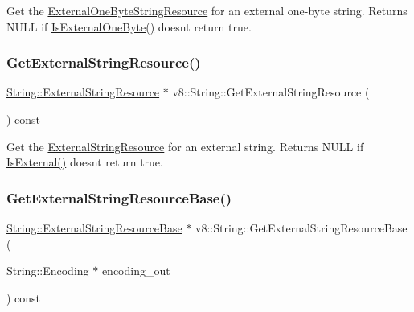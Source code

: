 Get the \mbox{\hyperlink{classv8_1_1String_1_1ExternalOneByteStringResource}{External\+One\+Byte\+String\+Resource}} for an external one-\/byte string. Returns N\+U\+LL if \mbox{\hyperlink{classv8_1_1String_a29b5d1786d906b84e10a5cab9451f976}{Is\+External\+One\+Byte()}} doesn\textquotesingle{}t return true. \mbox{\label{classv8_1_1String_ac751c8c239eb213a879204cab6787883}} 
\subsubsection{\texorpdfstring{Get\+External\+String\+Resource()}{GetExternalStringResource()}}
{\footnotesize\ttfamily \mbox{\hyperlink{classv8_1_1String_1_1ExternalStringResource}{String\+::\+External\+String\+Resource}} $\ast$ v8\+::\+String\+::\+Get\+External\+String\+Resource (\begin{DoxyParamCaption}{ }\end{DoxyParamCaption}) const}

Get the \mbox{\hyperlink{classv8_1_1String_1_1ExternalStringResource}{External\+String\+Resource}} for an external string. Returns N\+U\+LL if \mbox{\hyperlink{classv8_1_1String_a1d24faa97c6168221ec362c395d41ce1}{Is\+External()}} doesn\textquotesingle{}t return true. \mbox{\label{classv8_1_1String_a3031c6406f3f84bbc2d9810477a07489}} 
\subsubsection{\texorpdfstring{Get\+External\+String\+Resource\+Base()}{GetExternalStringResourceBase()}}
{\footnotesize\ttfamily \mbox{\hyperlink{classv8_1_1String_1_1ExternalStringResourceBase}{String\+::\+External\+String\+Resource\+Base}} $\ast$ v8\+::\+String\+::\+Get\+External\+String\+Resource\+Base (\begin{DoxyParamCaption}\item[{String\+::\+Encoding $\ast$}]{encoding\+\_\+out }\end{DoxyParamCaption}) const}

